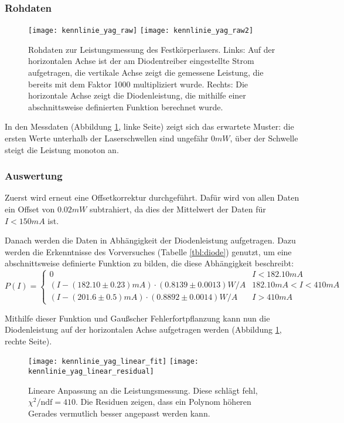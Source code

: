 \documentclass{../Misc/MontavonLaTeX/Montavon}
\newcommand{\halfwidth}{0.48\textwidth}
\begin{document}
\subsubsection{Rohdaten}
\begin{figure}[htbp]
\centering
\texttt{[image: kennlinie\_yag\_raw]}
\texttt{[image: kennlinie\_yag\_raw2]}
\caption{Rohdaten zur Leistungsmessung des Festkörperlasers. Links: Auf der horizontalen Achse ist der am Diodentreiber eingestellte Strom aufgetragen, die vertikale Achse zeigt die gemessene Leistung, die bereits mit dem Faktor 1000 multipliziert wurde. Rechts: Die horizontale Achse zeigt die Diodenleistung, die mithilfe einer abschnittsweise definierten Funktion berechnet wurde.}
\label{fig:kennlinie_yag_raw}
\end{figure}

In den Messdaten (Abbildung \ref{fig:kennlinie_yag_raw}, linke Seite) zeigt sich das erwartete Muster: die ersten Werte unterhalb der Laserschwellen sind ungefähr $0 \unit{mW}$, über der Schwelle steigt die Leistung monoton an. 

\subsubsection{Auswertung}
Zuerst wird erneut eine Offsetkorrektur durchgeführt. Dafür wird von allen Daten ein Offset von $0.02 \unit{mW}$ subtrahiert, da dies der Mittelwert der Daten für $I < 150 \unit{mA}$ ist.

Danach werden die Daten in Abhängigkeit der Diodenleistung aufgetragen. Dazu werden die Erkenntnisse des Vorversuches (Tabelle \ref{tbl:diode}) genutzt, um eine abschnittsweise definierte Funktion zu bilden, die diese Abhängigkeit beschreibt:
\[
	P(I) = \left\{ \begin{array}{ll}	0 & I < 182.10 \unit{mA} \\
									(I - (182.10 \pm 0.23) \unit{mA}) \cdot (0.8139 \pm 0.0013) \unit{W/A} & 182.10 \unit{mA} < I < 410 \unit{mA} \\
									(I - (201.6 \pm 0.5) \unit{mA}) \cdot (0.8892 \pm 0.0014) \unit{W/A} & I > 410 \unit{mA}\end{array} \right.
\]

Mithilfe dieser Funktion und Gaußscher Fehlerfortpflanzung kann nun die Diodenleistung auf der horizontalen Achse aufgetragen werden (Abbildung \ref{fig:kennlinie_yag_raw}, rechte Seite).

\begin{figure}
\centering
\texttt{[image: kennlinie\_yag\_linear\_fit]}
\texttt{[image: kennlinie\_yag\_linear\_residual]}
\caption{Lineare Anpassung an die Leistungsmessung. Diese schlägt fehl, $\chi^2 / \textrm{ndf} = 410$. Die Residuen zeigen, dass ein Polynom höheren Gerades vermutlich besser angepasst werden kann.}
\label{fig:kennlinie_yag_linear}
\end{figure}
\end{document}
